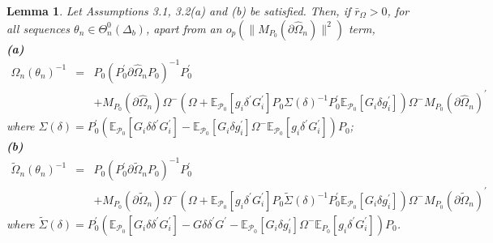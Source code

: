\documentclass[hidelinks, 11 pt, a4paper, pdflatex]{article}
\newtheorem{lemma}{Lemma}[section]
\begin{document}
{   \begin{lemma}
    Let Assumptions 3.1, 3.2(a) and (b) be satisfied. Then, if $\bar{r}_{\Omega} > 0$, for all sequences $\theta_{n} \in \Theta_{n}^{0}(\Delta_{b})$, apart from an $o_{p}(\|M_{P_{0}} (\partial \hat{\Omega}_{n})\|^{2})$ term, \\ \textbf{(a)}
     \begin{eqnarray*}
      \hat{\Omega}_{n}(\theta_{n})^{-1} & = & P_{0}(P_{0}^{\prime} \partial \hat{\Omega}_{n}P_{0})^{-1} P_{0}^{\prime} \\
                                        &   & + M_{P_{0}}(\partial \hat{\Omega}_{n})\Omega^{-}(\Omega + 
                                               \mathbb{E}_{\mathcal{P}_{0}}[g_{i}\delta^{\prime}G_{i}^{\prime}]
                                               P_{0}\Sigma(\delta)^{-1}P_{0}^{\prime} \mathbb{E}_{\mathcal{P}_{0}}[G_{i}\delta g_{i}^{\prime}]) \Omega ^{-}M_{P_{0}}(\partial \hat{\Omega}_{n})^{\prime}
     \end{eqnarray*}
     where $\Sigma(\delta) = P_{0}^{\prime} (\mathbb{E}_{\mathcal{P}_{0}}[G_{i}\delta \delta^{\prime}G_{i}^{\prime }]
     - \mathbb{E}_{\mathcal{P}_{0}}[G_{i}\delta g_{i}^{\prime }] \Omega^{-} \mathbb{E}_{\mathcal{P}_{0}}[g_{i}\delta^{\prime}G_{i}^{\prime}])P_{0}$; \\
    \textbf{(b)}
     \begin{eqnarray*}
      \tilde{\Omega}_{n}(\theta_{n})^{-1} & = & P_{0}(P_{0}^{\prime }\partial \tilde{\Omega}_{n}P_{0})^{-1}P_{0}^{\prime} \\
                                          &   & + M_{P_{0}}(\partial \tilde{\Omega}_{n}) \Omega^{-}
                                                 (\Omega + \mathbb{E}_{\mathcal{P}_{0}}[g_{i}\delta^{\prime}G_{i}^{\prime}]
                                                   P_{0}\tilde{\Sigma}(\delta)^{-1}P_{0}^{\prime}
                                                   \mathbb{E}_{\mathcal{P}_{0}}[G_{i}\delta g_{i}^{\prime}])
                                                  \Omega^{-}M_{P_{0}}(\partial \tilde{\Omega}_{n})^{\prime}
     \end{eqnarray*}
     where $\tilde{\Sigma}(\delta) = P_{0}^{\prime}(\mathbb{E}_{\mathcal{P}_{0}}[G_{i}\delta \delta^{\prime}G_{i}^{\prime}] - G\delta \delta^{\prime}G^{\prime} - \mathbb{E}_{\mathcal{P}_{0}}[G_{i}\delta g_{i}^{\prime}]\Omega^{-}\mathbb{E}_{P_{0}}[g_{i}\delta^{\prime}G_{i}^{\prime}])P_{0}$.
   \end{lemma}

}
\end{document}

